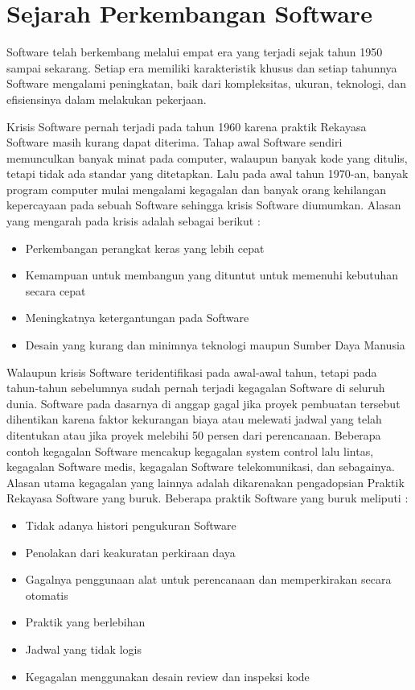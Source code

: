 \section{Sejarah Perkembangan Software}
\begin{flushleft}
Software telah berkembang melalui empat era yang terjadi sejak tahun 1950 sampai sekarang. Setiap era memiliki karakteristik khusus dan setiap tahunnya Software mengalami peningkatan, baik dari kompleksitas, ukuran, teknologi, dan efisiensinya dalam melakukan pekerjaan. 
\end{flushleft}
\begin{flushleft}
Krisis Software pernah terjadi pada tahun 1960 karena praktik Rekayasa Software masih kurang dapat diterima. Tahap awal Software sendiri memunculkan banyak minat pada computer, walaupun banyak kode yang ditulis, tetapi tidak ada standar yang ditetapkan. Lalu pada awal tahun 1970-an, banyak program computer mulai mengalami kegagalan dan banyak orang kehilangan kepercayaan pada sebuah Software sehingga krisis Software diumumkan. Alasan yang mengarah pada krisis adalah sebagai berikut :
\begin{itemize}
	\item Perkembangan perangkat keras yang lebih cepat
	\item Kemampuan untuk membangun yang dituntut untuk memenuhi kebutuhan secara cepat
	\item Meningkatnya ketergantungan pada Software
	\item Desain yang kurang dan minimnya teknologi maupun Sumber Daya Manusia
\end{itemize}
\end{flushleft}
\begin{flushleft}
Walaupun krisis Software teridentifikasi pada awal-awal tahun, tetapi pada tahun-tahun sebelumnya sudah pernah terjadi kegagalan Software di seluruh dunia. Software pada dasarnya di anggap gagal jika proyek pembuatan tersebut dihentikan karena faktor kekurangan biaya atau melewati jadwal yang telah ditentukan atau jika proyek melebihi 50 persen dari perencanaan. Beberapa contoh kegagalan Software mencakup kegagalan system control lalu lintas, kegagalan Software medis, kegagalan Software telekomunikasi, dan sebagainya. Alasan utama kegagalan yang lainnya adalah dikarenakan pengadopsian Praktik Rekayasa Software yang buruk. Beberapa praktik Software yang buruk meliputi : 
\begin{itemize}
	\item Tidak adanya histori pengukuran Software
	\item Penolakan dari keakuratan perkiraan daya
	\item Gagalnya penggunaan alat untuk perencanaan dan memperkirakan secara otomatis
	\item Praktik yang berlebihan
	\item Jadwal yang tidak logis
	\item Kegagalan menggunakan desain review dan inspeksi kode
\end{itemize}
\end{flushleft}
